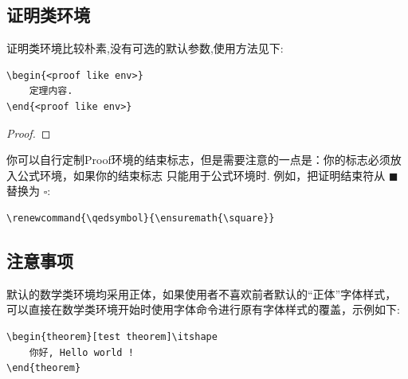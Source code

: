 \begin{axiom}
    \boomen \par 
    \boomcn
\end{axiom}

\begin{proposition}
    \boomen \par 
    \boomcn
\end{proposition}

\ExplSyntaxOn
{}
\ExplSyntaxOff

\subsection{证明类环境}
证明类环境比较朴素,没有可选的默认参数,使用方法见下:
\begin{verbatim}
\begin{<proof like env>}
    定理内容.
\end{<proof like env>}
\end{verbatim}
\vspace*{-2em}

\begin{proof}
    \boomen \par 
    \boomcn
\end{proof}

\begin{example}
    \boomen \par 
    \boomcn
\end{example}

你可以自行定制Proof环境的结束标志，但是需要注意的一点是：你的标志必须放入公式环境，如果你的结束标志
只能用于公式环境时. 例如，把证明结束符从 \(\blacksquare\) 替换为 $\square$:
\begin{verbatim}
\renewcommand{\qedsymbol}{\ensuremath{\square}}
\end{verbatim}


\subsection{注意事项}
默认的数学类环境均采用正体\cmd{\upshape}，如果使用者不喜欢前者默认的``正体''字体样式，
可以直接在数学类环境开始时使用字体命令\cmd{\itshape}进行原有字体样式的覆盖，示例如下:

\begin{verbatim}
\begin{theorem}[test theorem]\itshape
    你好, Hello world !
\end{theorem}
\end{verbatim}


